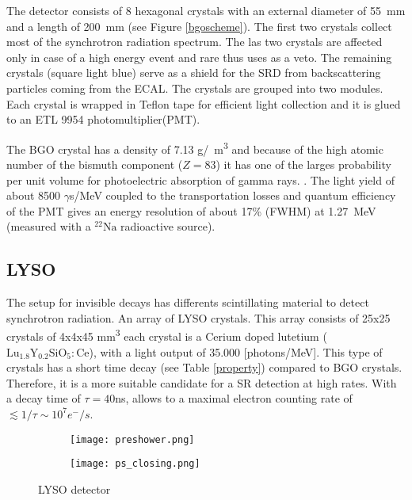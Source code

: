 The detector consists of 8 hexagonal crystals with an external diameter of \SI{55}{mm} and a length of \SI{200}{mm} (see
Figure \ref{bgoscheme}). The first two crystals collect most of the synchrotron radiation spectrum. The las two crystals
are affected only in case of a high energy event and rare thus uses as a veto. The remaining crystals (square light
blue) serve as a shield for the SRD from backscattering particles coming from the ECAL. The crystals are grouped into
two modules. Each crystal is wrapped in Teflon tape for efficient light collection and it is glued to an ETL 9954
photomultiplier(PMT).\par


The BGO crystal has a density of 7.13 \si{\gram/\centi\cubic\metre} and because of the high atomic number of the bismuth
component ($Z=83$) it has one of the larges probability per unit volume for photoelectric absorption of gamma rays.
\cite{bgodatashet}. The light yield of about 8500 $\gamma$s/MeV coupled to the transportation losses and
quantum efficiency of the PMT gives an energy resolution of about 17\% (FWHM) at \SI{1.27}{MeV} (measured with a
$\mathrm{^{22}Na}$ radioactive source).\par


\subsection{LYSO}

The setup for invisible decays has differents scintillating material to detect synchrotron radiation. An array of
LYSO\cite{lysogobain} crystals.  This array consists of 25x25 crystals of 4x4x45 \si{\cubic\milli\metre} each crystal is
a Cerium doped lutetium ($\mathrm{Lu_{1.8}Y_{0.2}SiO_5:Ce}$), with a light output of 35.000 [photons/MeV].  This type of
crystals has a short time decay (see Table \ref{property}) compared to BGO crystals.  Therefore, it is a more suitable
candidate for a SR detection at high rates. With a decay time of $\tau=40$ns, allows to a maximal electron counting rate
of $\lesssim 1/\tau \sim 10^7 e^-/s$.\par

\begin{figure}[hb]
	\hspace*{\fill}
	\centering
		\begin{subfigure}[b]{0.45\textwidth}
			\texttt{[image: preshower.png]}
			\caption{}\label{uvtnet}
		\end{subfigure}
		\hfill
		\begin{subfigure}[b]{0.45\textwidth}
			\texttt{[image: ps\_closing.png]}
			\caption{}\label{housing}
		\end{subfigure}
\hspace*{\fill}
	\caption{LYSO detector}\label{preshower}
\end{figure}

